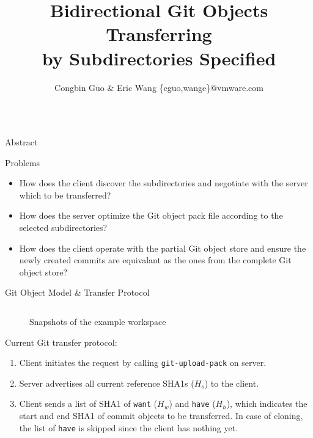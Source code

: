 \documentclass[final]{beamer}
\title{Bidirectional Git Objects Transferring\\ by Subdirectories Specified}
\author{Congbin Guo \& Eric Wang \{cguo,wange\}@vmware.com}
\institute{SCM Team, VMware Inc.}
\begin{document}
\begin{frame}[t, fragile]
  \begin{columns}[t]
    \begin{column}{.49\linewidth}
      \begin{block}{Abstract}
        
      \end{block}
      \begin{block}{Problems}
\begin{itemize}
    \justifying
  \item How does the client discover the subdirectories and negotiate with
      the server which to be transferred?

  \item How does the server optimize the Git object pack file according to the
      selected subdirectories?

  \item How does the client operate with the partial Git object store and
      ensure the newly created commits are equivalant as the ones
      from the complete Git object store?
\end{itemize}
      \end{block}
      \begin{block}{Git Object Model \& Transfer Protocol}
        \begin{columns}[T]
          \begin{column}{.47\textwidth}
              \begin{figure}\centering
                \caption{Snapshots of the example workspace}
              \end{figure}
            Current Git transfer protocol:
\begin{enumerate}
    \justifying
  \item Client initiates the request by calling \verb|git-upload-pack| on
    server.

  \item Server advertises all current reference SHA1s ($H_s$) to the client.

  \item Client sends a list of SHA1 of \verb|want| ($H_w$) and \verb|have|
    ($H_h$), which indicates the start and end SHA1 of commit objects to be
    transferred.
    In case of cloning, the list of \verb|have| is skipped since the client has
    nothing yet.


\end{enumerate}
\end{column}
\end{columns}
\end{block}
\end{column}
\end{columns}
\end{frame}
\end{document}
